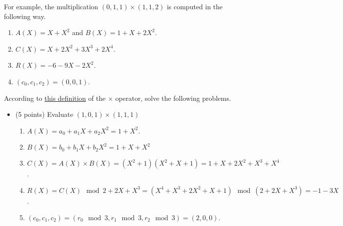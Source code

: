 \documentclass[11pt]{article}
\begin{document}
\begin{enumerate}
\begin{boxedminipage}{\linewidth}
\begin{enumerate}
  \end{enumerate}
  \end{boxedminipage}
  
  
  For example, the multiplication $(0,1,1)\times (1,1,2)$ is computed in the following way.
  \begin{enumerate}
  \item $A(X) = X + X^2$ and $B(X) = 1+X+2X^2$. 
  \item $C(X) = X + 2X^2 + 3X^3 + 2X^4$.
  \item $R(X) = -6-9X-2X^2$.
  \item $(c_0,c_1,c_2) = (0,0,1)$.
  \end{enumerate}
   
  
  According to \underline{this definition} of the $\times$ operator, solve the following problems. 
  \begin{itemize}
  \item (5 points) Evaluate $(1,0,1) \times (1,1,1) $ \newline
  {\bfseries
      \newline
      \newline

      \begin{enumerate}
      \item $A(X) = a_0 + a_1X + a_2X^2 = 1 + X^2$.
      \item $B(X) = b_0 + b_1X + b_2X^2 = 1 + X + X^2$
      \item $C(X) = A(X)\times B(X) = (X^2 + 1)(X^2 + X + 1) = 1 + X + 2X^2 + X^3 + X^4$.
      \item $R(X) = C(X) \mod 2+2X+X^3 = (X^4 + X^3 + 2X^2 + X + 1)\mod (2 + 2X + X^3) = -1 -3X$.
      \item $(c_0,c_1,c_2) = (r_0\mod 3, r_1\mod 3, r_2\mod 3) = (2, 0, 0)$.
      \end{enumerate}

}
\end{itemize}
\end{enumerate}
\end{document}
